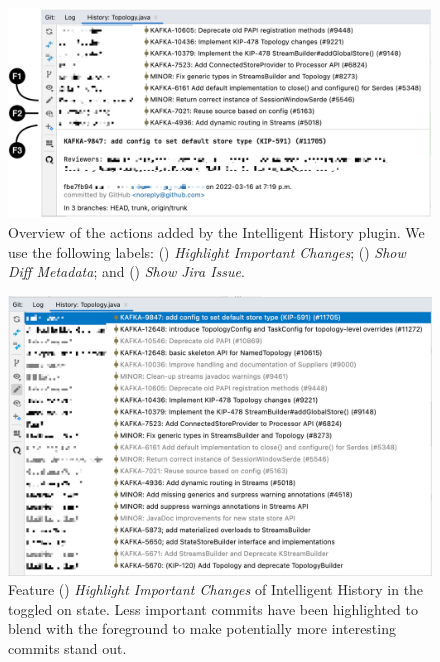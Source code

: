 \begin{figure}
    \includegraphics[width=\textwidth]{./images/intelligent-history-overview.png}
    \caption{
        Overview of the actions added by the Intelligent History plugin. 
        We use the following labels: () \textit{Highlight Important Changes}; () \textit{Show Diff Metadata}; and () \textit{Show Jira Issue}.
    }
    \label{fig:Intelligent-History-Overview}
\end{figure}

\begin{figure}
    \includegraphics[width=\textwidth]{./images/intelligent-history-A.png}
    \caption{
        Feature () \textit{Highlight Important Changes} of Intelligent History in the toggled on state. Less important commits have been highlighted to blend with the foreground to make potentially more interesting commits stand out.
    }
    \label{fig:Intelligent-History-A}
\end{figure}

